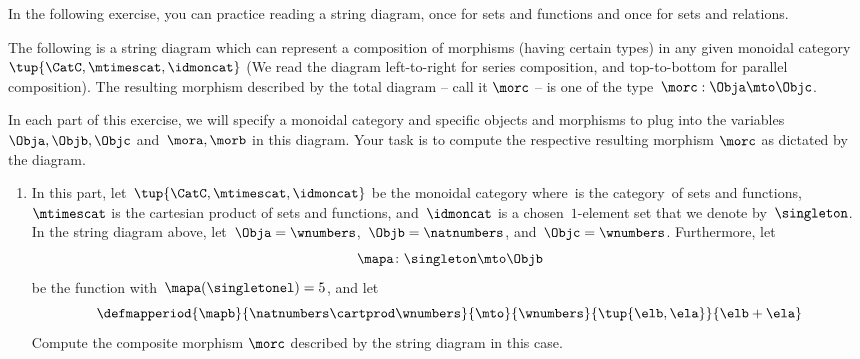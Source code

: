 In the following exercise, you can practice reading a string diagram, once for sets and functions and once for sets and relations.

\begin{gradedexercise}\label{ex:StringDiagrams}

    The following is a string diagram which can represent a composition of morphisms (having certain types) in any given monoidal category~$\tup{\CatC,\mtimescat,\idmoncat}$
    (We read the diagram left-to-right for series composition, and top-to-bottom for parallel composition).
    The resulting morphism described by the total diagram -- call it $\morc$ -- is one of the type~$\morc : \Obja \mto \Objc$.

    \begin{center}
        \label{eq:ExamStringDiagram1}
    \end{center}

    In each part of this exercise, we will specify a monoidal category and specific objects and morphisms to plug into the variables~$\Obja, \Objb, \Objc$ and~$\mora, \morb$ in this diagram.
    Your task is to compute the respective resulting morphism $\morc$ as dictated by the diagram.

    \begin{enumerate}
        \item In this part, let~$\tup{\CatC,\mtimescat,\idmoncat}$ be the monoidal category where~\CatC is the category~\Set of sets and functions,~$\mtimescat$ is the cartesian product of sets and functions, and~$\idmoncat$ is a chosen~$1$-element set that we denote by~$\singleton$.
              In the string diagram above, let~$\Obja = \wnumbers$,~$\Objb = \natnumbers$, and~$\Objc = \wnumbers$.
              Furthermore, let
              \begin{equation}
                  \mapa\colon \singleton \mto \Objb
              \end{equation}
              be the function with~$\mapa(\singletonel) = 5$, and let
              \begin{equation}
                  \defmapperiod{\mapb}{\natnumbers\cartprod \wnumbers}{\mto}{\wnumbers}{\tup{\elb,\ela}}{\elb+\ela}
              \end{equation}
              Compute the composite morphism $\morc$ described by the string diagram in this case.


\end{enumerate}
\end{gradedexercise}
